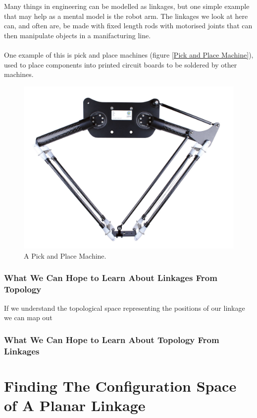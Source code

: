 \documentclass{article}
\begin{document}
Many things in engineering can be modelled as linkages, but one simple example that may help as a mental model is the robot arm. The linkages we look at here can, and often are, be made with fixed length rods with motorised joints that can then manipulate objects in a manifacturing line. \\\\ One example of this is pick and place machines (figure \ref{Pick and Place Machine}), used to place components into printed circuit boards to be soldered by other machines.

\begin{figure}[h!]
\centering
\includegraphics[scale=0.5]{./images/two_axis_pick_and_place.jpg}
\caption{A Pick and Place Machine.}
\label{fig:Pick and Place Machine}
\end{figure}

\subsubsection{What We Can Hope to Learn About Linkages From Topology}
If we understand the topological space representing the positions of our linkage we can map out 
\subsubsection{What We Can Hope to Learn About Topology From Linkages}

\section{Finding The Configuration Space of A Planar Linkage}
\end{document}
